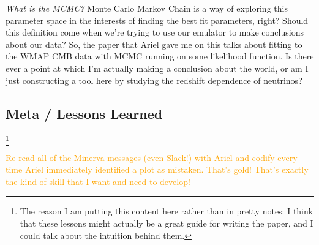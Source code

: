 \documentclass[11pt]{article}
\begin{document}
\textit{What is the MCMC?} Monte Carlo Markov Chain is a way of exploring this
parameter space in the interests of finding the best fit parameters, right?
Should this definition come
when we're trying to use our emulator to make conclusions about our data?
So, the paper that Ariel gave me on this talks about fitting to the WMAP
CMB data with MCMC running on some likelihood function. Is there ever a point
at which I'm actually making a conclusion about the world, or am I just
constructing a tool here by studying the redshift dependence of neutrinos? 

\begin{centering}
\section{Meta / Lessons Learned}
\end{centering}

\footnote{The reason I am putting this content here rather than in pretty
notes: I think that these lessons might actually be a great guide for writing
the paper, and I could talk about the intuition behind them.
}

\textcolor{orange}{Re-read all of the Minerva messages (even Slack!) with
Ariel and codify every time Ariel immediately identified a plot as mistaken.
That's gold! That's exactly the kind of skill that I want and need to develop!}
\end{document}
